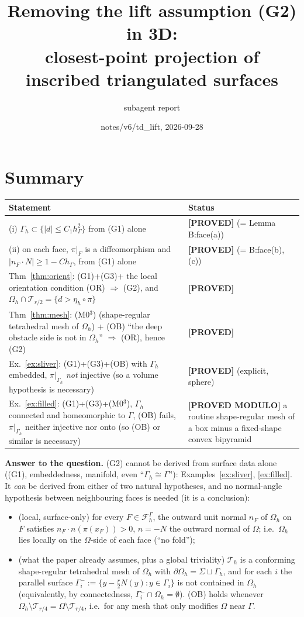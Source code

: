 \documentclass[11pt]{article}
\title{Removing the lift assumption (G2) in 3D:\\ closest-point projection of inscribed triangulated surfaces}
\author{subagent report}
\date{notes/v6/td\_lift, 2026-09-28}
\theoremstyle{definition}
\newcommand{\hG}{h_\Gamma}
\newcommand{\Gh}{\Gamma_h}
\newcommand{\Oh}{\Omega_h}
\newcommand{\Th}{\mathcal T_h}
\newcommand{\FG}{\mathcal F_h^\Gamma}
\newcommand{\status}[1]{\textbf{[#1]}}
\begin{document}
\maketitle

\section*{Summary}
\begin{center}
\begin{tabular}{p{}p{}}
\toprule
Statement & Status\\
\midrule
(i) $\Gh\subset\{|d|\le C_1\hG^2\}$ from (G1) alone & \status{PROVED} (= Lemma B:face(a))\\
(ii) on each face, $\pi|_F$ is a diffeomorphism and $|n_F\cdot N|\ge1-C\hG$, from (G1) alone & \status{PROVED} (= B:face(b),(c))\\
Thm~\ref{thm:orient}: (G1)+(G3)+ the local orientation condition (OR) $\Rightarrow$ (G2), and $\Oh\cap\mathcal T_{r/2}=\{d>\eta_h\circ\pi\}$ & \status{PROVED}\\
Thm~\ref{thm:mesh}: (M0$^3$) (shape-regular tetrahedral mesh of $\Oh$) + (OB) ``the deep obstacle side is not in $\Oh$'' $\Rightarrow$ (OR), hence (G2) & \status{PROVED}\\
Ex.~\ref{ex:sliver}: (G1)+(G3)+(OB) with $\Gh$ embedded, $\pi|_{\Gh}$ \emph{not} injective (so a volume hypothesis is necessary) & \status{PROVED} (explicit, sphere)\\
Ex.~\ref{ex:filled}: (G1)+(G3)+(M0$^3$), $\Gh$ connected and homeomorphic to $\Gamma$, (OB) fails, $\pi|_{\Gh}$ neither injective nor onto (so (OB) or similar is necessary) & \status{PROVED MODULO} a routine shape-regular mesh of a box minus a fixed-shape convex bipyramid\\
\bottomrule
\end{tabular}
\end{center}
\textbf{Answer to the question.} (G2) cannot be derived from surface data alone ((G1), embeddedness, manifold, even ``$\Gh\cong\Gamma$''): Examples~\ref{ex:sliver}, \ref{ex:filled}. It \emph{can} be derived from either of two natural hypotheses, and no normal-angle hypothesis between neighbouring faces is needed (it is a conclusion):
\begin{itemize}
\item[(OR)] (local, surface-only) for every $F\in\FG$, the outward unit normal $n_F$ of $\Oh$ on $F$ satisfies $n_F\cdot n(\pi(x_F))>0$, $n=-N$ the outward normal of $\Omega$; i.e.\ $\Oh$ lies locally on the $\Omega$-side of each face (``no fold'');
\item[(M0$^3$)+(OB)] (what the paper already assumes, plus a global triviality) $\Th$ is a conforming shape-regular tetrahedral mesh of $\Oh$ with $\partial\Oh=\Sigma\sqcup\Gh$, and for each $i$ the parallel surface $\Gamma_i^-:=\{y-\frac r2N(y):y\in\Gamma_i\}$ is not contained in $\Oh$ (equivalently, by connectedness, $\Gamma_i^-\cap\Oh=\emptyset$). (OB) holds whenever $\Oh\setminus\mathcal T_{r/4}=\Omega\setminus\mathcal T_{r/4}$, i.e.\ for any mesh that only modifies $\Omega$ near $\Gamma$.
\end{itemize}
\end{document}
